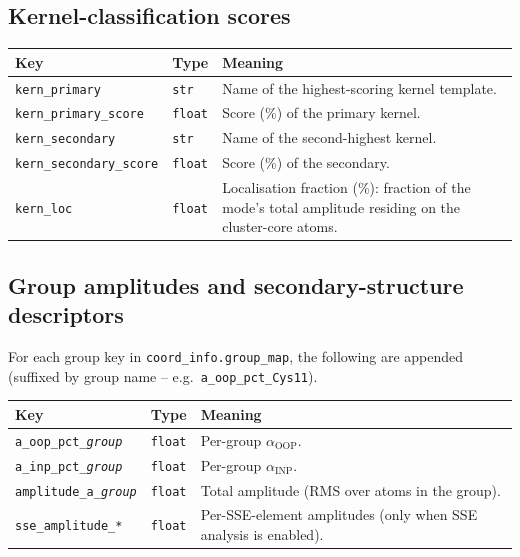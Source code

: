 \documentclass[10pt,a4paper,twoside]{article}
\newcommand{\OOP}{\mathrm{OOP}}
\newcommand{\INP}{\mathrm{INP}}
\newcommand{\fn}[1]{\texttt{#1}}
\begin{document}
\subsection{Kernel-classification scores}

\begin{longtable}{p{} p{} p{}}
\toprule
\textbf{Key} & \textbf{Type} & \textbf{Meaning} \\
\midrule
\texttt{kern\_primary} & \texttt{str}
  & Name of the highest-scoring kernel template. \\
\texttt{kern\_primary\_score} & \texttt{float}
  & Score (\%) of the primary kernel. \\
\texttt{kern\_secondary} & \texttt{str}
  & Name of the second-highest kernel. \\
\texttt{kern\_secondary\_score} & \texttt{float}
  & Score (\%) of the secondary. \\
\texttt{kern\_loc} & \texttt{float}
  & Localisation fraction (\%): fraction of the mode's total
    amplitude residing on the cluster-core atoms. \\
\bottomrule
\end{longtable}

\subsection{Group amplitudes and secondary-structure descriptors}

For each group key in \fn{coord\_info.group\_map}, the following are
appended (suffixed by group name -- e.g.\ \texttt{a\_oop\_pct\_Cys11}).

\begin{longtable}{p{} p{} p{}}
\toprule
\textbf{Key} & \textbf{Type} & \textbf{Meaning} \\
\midrule
\texttt{a\_oop\_pct\_\textit{group}} & \texttt{float}
  & Per-group $\alpha_{\OOP}$. \\
\texttt{a\_inp\_pct\_\textit{group}} & \texttt{float}
  & Per-group $\alpha_{\INP}$. \\
\texttt{amplitude\_a\_\textit{group}} & \texttt{float}
  & Total amplitude (RMS over atoms in the group). \\
\texttt{sse\_amplitude\_*} & \texttt{float}
  & Per-SSE-element amplitudes (only when SSE analysis is enabled). \\
\bottomrule
\end{longtable}
\end{document}
